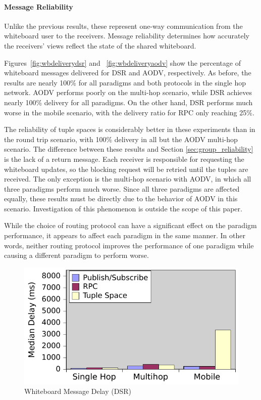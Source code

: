 \paragraph{Message Reliability}

Unlike the previous results, these represent one-way communication from the whiteboard user to the receivers. Message reliability determines how accurately the receivers' views reflect the state of the shared whiteboard.

Figures~\ref{fig:wbdeliverydsr} and ~\ref{fig:wbdeliveryaodv} show the percentage of whiteboard messages delivered for DSR and AODV, respectively. As before, the results are nearly 100\% for all paradigms and both protocols in the single hop network. AODV performs poorly on the multi-hop scenario, while DSR achieves nearly 100\% delivery for all paradigms. On the other hand, DSR performs much worse in the mobile scenario, with the delivery ratio for RPC only reaching 25\%.

The reliability of tuple spaces is considerably better in these experiments than in the round trip scenario, with 100\% delivery in all but the AODV multi-hop scenario. The difference between these results and Section \ref{sec:group_reliability} is the lack of a return message. Each receiver is responsible for requesting the whiteboard updates, so the blocking request will be retried until the tuples are received. The only exception is the multi-hop scenario with AODV, in which all three paradigms perform much worse. Since all three paradigms are affected equally, these results must be directly due to the behavior of AODV in this scenario. Investigation of this phenomenon is outside the scope of this paper.

While the choice of routing protocol can have a significant effect on the paradigm performance, it appears to affect each paradigm in the same manner. In other words, neither routing protocol improves the performance of one paradigm while causing a different paradigm to perform worse.

\begin{figure}
\centering
\label{fig:wbdelaydsr}
\includegraphics[scale = 1, clip, trim = 6px 0px 4px 3px]{figures/wb-dsr-delay.pdf}
\caption{Whiteboard Message Delay (DSR)}
\end{figure}

